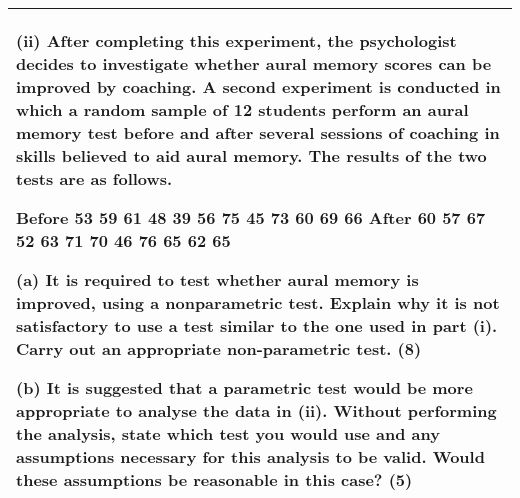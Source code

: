 \documentclass[a4paper,12pt]{article}
\begin{document}
\begin{table}[ht!]
 
\centering
 
\begin{tabular}{|p{15cm}|}
 
\hline  
(ii) After completing this experiment, the psychologist decides to investigate whether aural memory scores can be improved by coaching.  A second experiment is conducted in which a random sample of 12 students perform an aural memory test before and after several sessions of coaching in skills believed to aid aural memory.  The results of the two tests are as follows. 
 
Before 53 59 61 48 39 56 75 45 73 60 69 66 After 60 57 67 52 63 71 70 46 76 65 62 65 
 
(a) It is required to test whether aural memory is improved, using a nonparametric test.  Explain why it is not satisfactory to use a test similar to the one used in part (i).  Carry out an appropriate non-parametric test. (8) 
 
(b) It is suggested that a parametric test would be more appropriate to analyse the data in (ii).  Without performing the analysis, state which test you would use and any assumptions necessary for this analysis to be valid.  Would these assumptions be reasonable in this case? (5) 
 
 

\\ \hline
  
\end{tabular}

\end{table}
\end{document}

